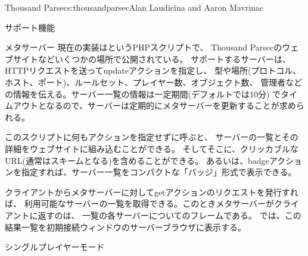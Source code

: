 \begin{aosachapter}{Thousand Parsec}{s:thousandparsec}{Alan Laudicina and Aaron Mavrinac}
\begin{aosasect1}{サポート機能}
\begin{aosasect2}{メタサーバー}
現在の実装はというPHPスクリプトで、
Thousand Parsecのウェブサイトなどいくつかの場所で公開されている。
サポートするサーバーは、HTTPリクエストを送ってupdateアクションを指定し、
型や場所(プロトコル、ホスト、ポート)、ルールセット、プレイヤー数、オブジェクト数、
管理者などの情報を伝える。サーバー一覧の情報は一定期間(デフォルトでは10分)
でタイムアウトとなるので、サーバーは定期的にメタサーバーを更新することが求められる。

このスクリプトに何もアクションを指定せずに呼ぶと、
サーバーの一覧とその詳細をウェブサイトに組み込むことができる。
そしてそこに、クリッカブルなURL(通常はスキームとなる)を含めることができる。
あるいは、badgeアクションを指定すれば、サーバー一覧をコンパクトな「バッジ」形式で表示できる。

クライアントからメタサーバーに対してgetアクションのリクエストを発行すれば、
利用可能なサーバーの一覧を取得できる。このときメタサーバーがクライアントに返すのは、
一覧の各サーバーについてのフレームである。
では、この結果一覧を初期接続ウィンドウのサーバーブラウザに表示する。

\end{aosasect2}

\begin{aosasect2}{シングルプレイヤーモード}


\end{aosasect2}
\end{aosasect1}
\end{aosachapter}

